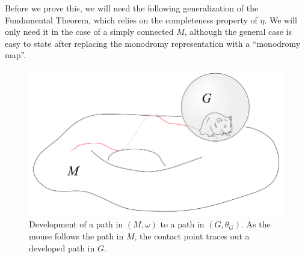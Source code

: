 Before we prove this, we will need the following generalization of the Fundamental Theorem, which relies on the completeness property of $\eta$. We will only need it in the case of a simply connected $M$, although the general case is easy to state after replacing the monodromy representation with a ``monodromy map''.

\begin{figure}[tp]
    \centering
    \includegraphics[scale=0.2]{figures/development.png}
    \caption{Development of a path in $(M,\omega)$ to a path in $(G,\theta_G)$. As the mouse follows the path in $M$, the contact point traces out a developed path in $G$.}
    \label{fig:development} 
\end{figure}


